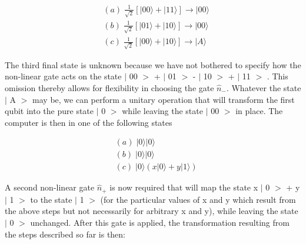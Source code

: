 \documentclass{article}
\begin{document}
\begin{align}
&  (a)\;\frac{1}{\sqrt{2}}\left[  |00\rangle+|11\rangle\right]
\longrightarrow|00\rangle\nonumber\\
&  (b)\;\frac{1}{\sqrt{2}}\left[  |01\rangle+|10\rangle\right]
\longrightarrow|00\rangle\\
&  (c)\;\frac{1}{\sqrt{2}}\left[  |00\rangle+|10\rangle\right]
\longrightarrow|A\rangle\nonumber
\end{align}

The third final state is unknown because we have not bothered to specify how
the non-linear gate acts on the state
$\vert$%
00%
$>$%
+
$\vert$%
01%
$>$%
-
$\vert$%
10%
$>$%
+
$\vert$%
11%
$>$%
. This omission thereby allows for flexibility in choosing the gate
$\widehat{n}_{-}$. Whatever the state
$\vert$%
A%
$>$%
may be, we can perform a unitary operation that will transform the first qubit
into the pure state
$\vert$%
0%
$>$%
while leaving the state
$\vert$%
00%
$>$%
in place. The computer is then in one of the following states%

\begin{align}
&  (a)\;|0\rangle|0\rangle\nonumber\\
&  (b)\;|0\rangle|0\rangle\\
&  (c)\;|0\rangle(x|0\rangle+y|1\rangle)\nonumber
\end{align}

A second non-linear gate $\widehat{n}_{+}$ is now required that will map the
state x%
$\vert$%
0%
$>$%
+ y%
$\vert$%
1%
$>$%
to the state
$\vert$%
1%
$>$%
(for the particular values of x and y which result from the above steps but
not necessarily for arbitrary x and y), while leaving the state
$\vert$%
0%
$>$%
unchanged. After this gate is applied, the transformation resulting from the
steps described so far is then:%
\end{document}
